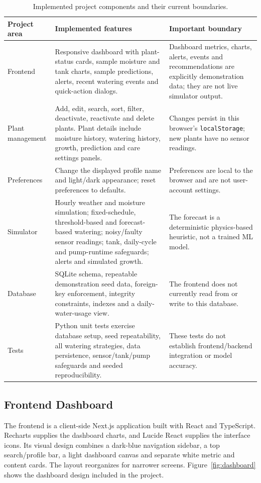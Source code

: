 \documentclass[11pt,a4paper]{article}
\newcommand{\cn}[1]{\texttt{#1}}   %
\begin{document}
\begin{table}[htbp]
\centering
\small
\begin{tabularx}{\textwidth}{@{}l Y Y@{}}
  \toprule
  \textbf{Project area} & \textbf{Implemented features} & \textbf{Important boundary}\\
  \midrule
  Frontend & Responsive dashboard with plant-status cards, sample moisture and tank charts, sample predictions, alerts, recent watering events and quick-action dialogs. & Dashboard metrics, charts, alerts, events and recommendations are explicitly demonstration data; they are not live simulator output.\\
  Plant management & Add, edit, search, sort, filter, deactivate, reactivate and delete plants. Plant details include moisture history, watering history, growth, prediction and care settings panels. & Changes persist in this browser's \cn{localStorage}; new plants have no sensor readings.\\
  Preferences & Change the displayed profile name and light/dark appearance; reset preferences to defaults. & Preferences are local to the browser and are not user-account settings.\\
  Simulator & Hourly weather and moisture simulation; fixed-schedule, threshold-based and forecast-based watering; noisy/faulty sensor readings; tank, daily-cycle and pump-runtime safeguards; alerts and simulated growth. & The forecast is a deterministic physics-based heuristic, not a trained ML model.\\
  Database & SQLite schema, repeatable demonstration seed data, foreign-key enforcement, integrity constraints, indexes and a daily-water-usage view. & The frontend does not currently read from or write to this database.\\
  Tests & Python unit tests exercise database setup, seed repeatability, all watering strategies, data persistence, sensor/tank/pump safeguards and seeded reproducibility. & These tests do not establish frontend/backend integration or model accuracy.\\
  \bottomrule
\end{tabularx}
\caption{Implemented project components and their current boundaries.}
\end{table}

\subsection{Frontend Dashboard}
The frontend is a client-side Next.js application built with React and
TypeScript. Recharts supplies the dashboard charts, and Lucide React supplies
the interface icons. Its visual design combines a dark-blue navigation
sidebar, a top search/profile bar, a light dashboard canvas and separate
white metric and content cards. The layout reorganizes for narrower screens.
Figure~\ref{fig:dashboard} shows the dashboard design included in the project.
\end{document}
